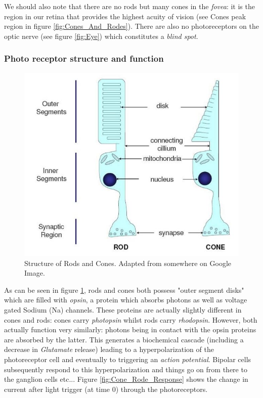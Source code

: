 We should also note that there are no rods but many cones in the \textit{fovea}: it is the region in our retina that provides the highest acuity of vision (see Cones peak region in figure \ref{fig:Cones_And_Rodes}). There are also no photoreceptors on the optic nerve (see figure \ref{fig:Eye}) which constitutes a \textit{blind spot}. 

\subsubsection{Photo receptor structure and function}


\begin{figure}[H]
    \centering
    \includegraphics[width=0.55\linewidth]{../../Figures/Rods_And_Cones_Structure.jpg}
    \caption{Structure of Rods and Cones. Adapted from somewhere on Google Image.}
    \label{fig:Rods_And_Cones_Structure}
\end{figure}

As can be seen in figure \ref{fig:Rods_And_Cones_Structure}, rods and cones both possess "outer segment disks" which are filled with \textit{opsin}, a protein which absorbs photons as well as voltage gated Sodium (Na) channels. These proteins are actually slightly different in cones and rods: cones carry \textit{photopsin} whilst rods carry \textit{rhodopsin}. However, both actually function very similarly: photons being in contact with the opsin proteins are absorbed by the latter. This generates a biochemical cascade (including a decrease in \textit{Glutamate} release) leading to a hyperpolarization of the photoreceptor cell and eventually to triggering an \textit{action potential}. Bipolar cells subsequently respond to this hyperpolarization and things go on from there to the ganglion cells etc...
Figure \ref{fig:Cone_Rode_Response} shows the change in current after light trigger (at time 0) through the photoreceptors.  

